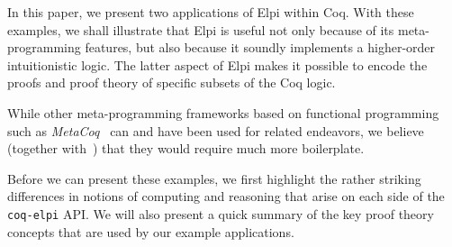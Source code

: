 In this paper, we present two applications of Elpi within Coq. With
these examples, we shall illustrate that Elpi is useful not only
because of its meta-programming features,
but also because it soundly
implements a higher-order intuitionistic logic.
The latter aspect of
Elpi makes it possible to encode the proofs and proof theory of
specific subsets of the Coq logic.


While other meta-programming frameworks based on functional
programming such as \emph{MetaCoq}~\cite{sozeau2020metacoq} can and have been used for related endeavors, we believe (together with~\cite{DunchevCT16}) that they would require much more boilerplate.

Before we can present these examples, we first highlight the rather
striking differences in notions of computing and reasoning that arise
on each side of the \texttt{coq-elpi} API.   We will also present a quick
summary of the key proof theory concepts that are used by our example
applications.


